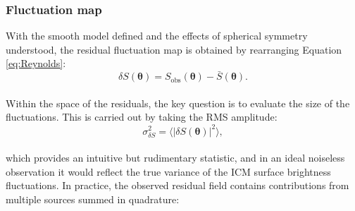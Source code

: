 



\subsubsection{Fluctuation map}

With the smooth model defined and the effects of spherical symmetry understood, the residual fluctuation map is obtained by rearranging Equation \ref{eq:Reynolds}:
%
\begin{equation}
	\delta S(\boldsymbol{\theta}) = 
	S_{\mathrm{obs}}(\boldsymbol{\theta}) - 
	\bar{S}(\boldsymbol{\theta}).
	\label{eq:fluctuations}
\end{equation}
\\
Within the space of the residuals, the key question is to evaluate the size of the fluctuations. This is carried out by taking the RMS amplitude:
\begin{equation}
	\sigma_{\delta S}^2 = 
	\langle |\delta S(\boldsymbol{\theta})|^2 \rangle,
	\label{eq:RMSdef}
\end{equation}
\\
which provides an intuitive but rudimentary statistic, and in an ideal noiseless observation it would reflect the true variance of the ICM surface brightness fluctuations. In practice, the observed residual field contains contributions from multiple sources summed in quadrature:

